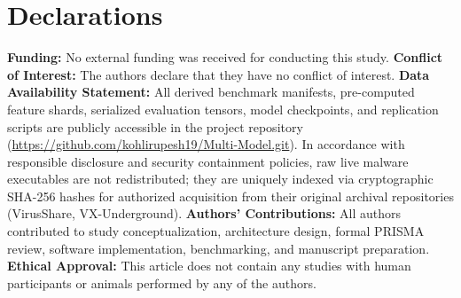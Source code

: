 \documentclass[pdflatex,sn-mathphys-num]{sn-jnl}
\begin{document}
\section{Declarations}\label{sec:declarations}
\textbf{Funding:} No external funding was received for conducting this study.  
\textbf{Conflict of Interest:} The authors declare that they have no conflict of interest.  
\textbf{Data Availability Statement:} All derived benchmark manifests, pre-computed feature shards, serialized evaluation tensors, model checkpoints, and replication scripts are publicly accessible in the project repository (\url{https://github.com/kohlirupesh19/Multi-Model.git}). In accordance with responsible disclosure and security containment policies, raw live malware executables are not redistributed; they are uniquely indexed via cryptographic SHA-256 hashes for authorized acquisition from their original archival repositories (VirusShare, VX-Underground).  
\textbf{Authors' Contributions:} All authors contributed to study conceptualization, architecture design, formal PRISMA review, software implementation, benchmarking, and manuscript preparation.  
\textbf{Ethical Approval:} This article does not contain any studies with human participants or animals performed by any of the authors.


\end{document}
